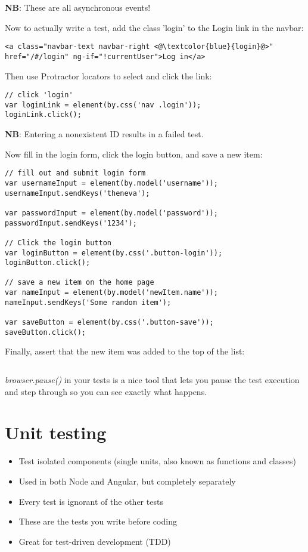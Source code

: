 \documentclass[british]{article}
\begin{document}
\textbf{NB}: These are all asynchronous events!

Now to actually write a test, add the class 'login' to the Login link in the navbar:

\begin{lstlisting}
<a class="navbar-text navbar-right <@\textcolor{blue}{login}@>" href="/#/login" ng-if="!currentUser">Log in</a>
\end{lstlisting}

Then use Protractor locators to select and click the link:

\begin{lstlisting}
// click 'login'
var loginLink = element(by.css('nav .login'));
loginLink.click();    
\end{lstlisting}

\textbf{NB}: Entering a nonexistent ID results in a failed test.

Now fill in the login form, click the login button, and save a new item:

\begin{lstlisting}
// fill out and submit login form
var usernameInput = element(by.model('username'));
usernameInput.sendKeys('theneva');

var passwordInput = element(by.model('password'));
passwordInput.sendKeys('1234');

// Click the login button
var loginButton = element(by.css('.button-login'));
loginButton.click();

// save a new item on the home page
var nameInput = element(by.model('newItem.name'));
nameInput.sendKeys('Some random item');

var saveButton = element(by.css('.button-save'));
saveButton.click();
\end{lstlisting}

Finally, assert that the new item was added to the top of the list:

\begin{lstlisting}

\end{lstlisting}

\textit{browser.pause()} in your tests is a nice tool that lets you pause the test execution and step through so you can see exactly what happens.

\section{Unit testing}

\begin{itemize}
  \item Test isolated components (single units, also known as functions and classes)
  \item Used in both Node and Angular, but completely separately
  \item Every test is ignorant of the other tests
  \item These are the tests you write before coding
  \item Great for test-driven development (TDD)
\end{itemize}
\end{document}
